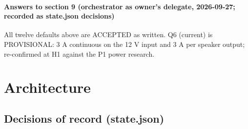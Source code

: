 \documentclass[11pt]{article}
\begin{document}
\paragraph*{Answers to section 9 (orchestrator as owner's delegate, 2026-09-27; recorded as state.json decisions)}
All twelve defaults above are ACCEPTED as written. Q6 (current) is PROVISIONAL: 3 A continuous on the 12 V input and 3 A per speaker output; re-confirmed at H1 against the P1 power research.

\section{Architecture}
\subsection*{Decisions of record (state.json)}
\end{document}

